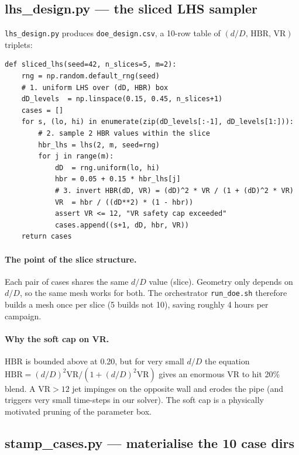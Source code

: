 \documentclass[11pt,a4paper]{article}
\newcommand{\dD}{\ensuremath{d/D}}
\newcommand{\VR}{\ensuremath{\mathrm{VR}}}
\newcommand{\HBR}{\ensuremath{\mathrm{HBR}}}
\begin{document}
\subsection{lhs\_design.py --- the sliced LHS sampler}

\texttt{lhs\_design.py} produces \texttt{doe\_design.csv}, a 10-row
table of $(\dD,\,\HBR,\,\VR)$ triplets:

\begin{lstlisting}[style=pystyle,caption={Sketch of \texttt{lhs\_design.py}}]
def sliced_lhs(seed=42, n_slices=5, m=2):
    rng = np.random.default_rng(seed)
    # 1. uniform LHS over (dD, HBR) box
    dD_levels  = np.linspace(0.15, 0.45, n_slices+1)
    cases = []
    for s, (lo, hi) in enumerate(zip(dD_levels[:-1], dD_levels[1:])):
        # 2. sample 2 HBR values within the slice
        hbr_lhs = lhs(2, m, seed=rng)
        for j in range(m):
            dD  = rng.uniform(lo, hi)
            hbr = 0.05 + 0.15 * hbr_lhs[j]
            # 3. invert HBR(dD, VR) = (dD)^2 * VR / (1 + (dD)^2 * VR)
            VR  = hbr / ((dD**2) * (1 - hbr))
            assert VR <= 12, "VR safety cap exceeded"
            cases.append((s+1, dD, hbr, VR))
    return cases
\end{lstlisting}

\paragraph{The point of the slice structure.}
Each pair of cases shares the same $\dD$ value (slice). Geometry only
depends on $\dD$, so the same mesh works for both. The orchestrator
\texttt{run\_doe.sh} therefore builds a mesh once per slice (5 builds
not 10), saving roughly 4 hours per campaign.

\paragraph{Why the soft cap on VR.}
$\HBR$ is bounded above at 0.20, but for very small $\dD$ the equation
$\HBR = (\dD)^2 \VR / (1+(\dD)^2 \VR)$ gives an enormous $\VR$ to hit
20\% blend. A $\VR>12$ jet impinges on the opposite wall and erodes
the pipe (and triggers very small time-steps in our solver). The
soft cap is a physically motivated pruning of the parameter box.

\subsection{stamp\_cases.py --- materialise the 10 case dirs}
\end{document}
